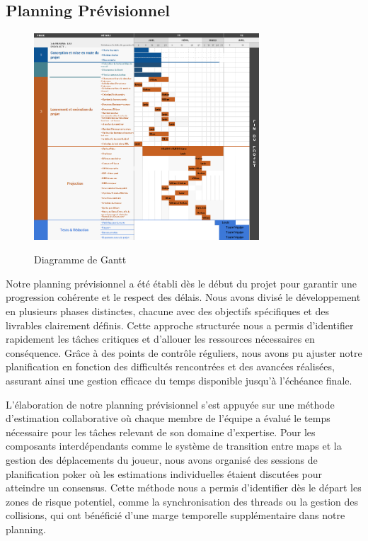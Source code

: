 \documentclass[12pt,a4paper, twoside]{article}
\begin{document}
\subsection{Planning Prévisionnel}
\begin{figure}[h]
    \centering
    \includegraphics[width=0.75\textwidth]{GANTT.png}
    \label{fig:GANTT}
    \caption{Diagramme de Gantt}
\end{figure}

Notre planning prévisionnel a été établi dès le début du projet pour garantir une progression cohérente et le respect des délais. Nous avons divisé le développement en plusieurs phases distinctes, chacune avec des objectifs spécifiques et des livrables clairement définis. Cette approche structurée nous a permis d'identifier rapidement les tâches critiques et d'allouer les ressources nécessaires en conséquence. Grâce à des points de contrôle réguliers, nous avons pu ajuster notre planification en fonction des difficultés rencontrées et des avancées réalisées, assurant ainsi une gestion efficace du temps disponible jusqu'à l'échéance finale.

L'élaboration de notre planning prévisionnel s'est appuyée sur une méthode d'estimation collaborative où chaque membre de l'équipe a évalué le temps nécessaire pour les tâches relevant de son domaine d'expertise. Pour les composants interdépendants comme le système de transition entre maps et la gestion des déplacements du joueur, nous avons organisé des sessions de planification poker où les estimations individuelles étaient discutées pour atteindre un consensus. Cette méthode nous a permis d'identifier dès le départ les zones de risque potentiel, comme la synchronisation des threads ou la gestion des collisions, qui ont bénéficié d'une marge temporelle supplémentaire dans notre planning.
\end{document}
